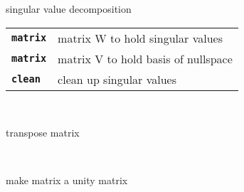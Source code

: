 \begin{description}
\begin{description}
        singular value decomposition

      \begin{tabular}{ll}
 \texttt{\textbf{matrix}} &  matrix W to hold singular values \\
 \texttt{\textbf{matrix}} &  matrix V to hold basis of nullspace \\
 \texttt{\textbf{clean}} &    clean up singular values  \\
      \end{tabular}
       \texttt{} \

        transpose matrix

       \texttt{} \

        make matrix a unity matrix

    \end{description}

\end{description}

